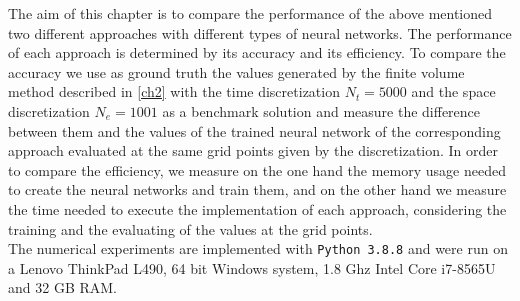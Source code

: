 The aim of this chapter is to compare the performance of the above mentioned two different approaches with different types of neural networks. The performance of each approach is determined by its accuracy and its efficiency. To compare the accuracy we use as ground truth the values generated by the finite volume method described in \cref{ch2} with the time discretization $N_t = 5000$ and the space discretization $N_e = 1001$ as a benchmark solution and measure the difference between them and the values of the trained neural network of the corresponding approach evaluated at the same grid points given by the discretization. In order to compare the efficiency, we measure on the one hand the memory usage needed to create the neural networks and train them, and on the other hand we measure the time needed to execute the implementation of each approach, considering the training and the evaluating of the values at the grid points. \\
The numerical experiments are implemented with \lstinline!Python 3.8.8! and were run on a Lenovo ThinkPad L490, 64 bit Windows system, 1.8 Ghz Intel Core i7-8565U and 32 GB RAM.


